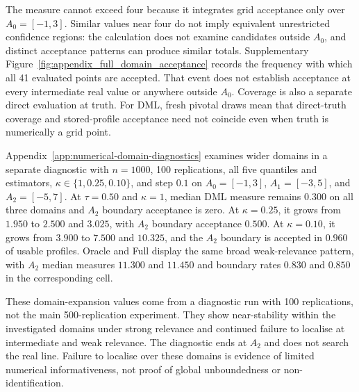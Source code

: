 The measure cannot exceed four because it integrates grid acceptance only over $A_0=[-1,3]$. Similar values near four do not imply equivalent unrestricted confidence regions: the calculation does not examine candidates outside $A_0$, and distinct acceptance patterns can produce similar totals. Supplementary Figure~\ref{fig:appendix_full_domain_acceptance} records the frequency with which all 41 evaluated points are accepted. That event does not establish acceptance at every intermediate real value or anywhere outside $A_0$. Coverage is also a separate direct evaluation at truth. For DML, fresh pivotal draws mean that direct-truth coverage and stored-profile acceptance need not coincide even when truth is numerically a grid point.

Appendix~\ref{app:numerical-domain-diagnostics} examines wider domains in a separate diagnostic with $n=1000$, 100 replications, all five quantiles and estimators, $\kappa\in\{1,0.25,0.10\}$, and step $0.1$ on $A_0=[-1,3]$, $A_1=[-3,5]$, and $A_2=[-5,7]$. At $\tau=0.50$ and $\kappa=1$, median DML measure remains $0.300$ on all three domains and $A_2$ boundary acceptance is zero. At $\kappa=0.25$, it grows from $1.950$ to $2.500$ and $3.025$, with $A_2$ boundary acceptance $0.500$. At $\kappa=0.10$, it grows from $3.900$ to $7.500$ and $10.325$, and the $A_2$ boundary is accepted in $0.960$ of usable profiles. Oracle and Full display the same broad weak-relevance pattern, with $A_2$ median measures $11.300$ and $11.450$ and boundary rates $0.830$ and $0.850$ in the corresponding cell.

These domain-expansion values come from a diagnostic run with 100 replications, not the main 500-replication experiment. They show near-stability within the investigated domains under strong relevance and continued failure to localise at intermediate and weak relevance. The diagnostic ends at $A_2$ and does not search the real line. Failure to localise over these domains is evidence of limited numerical informativeness, not proof of global unboundedness or non-identification.

\FloatBarrier

